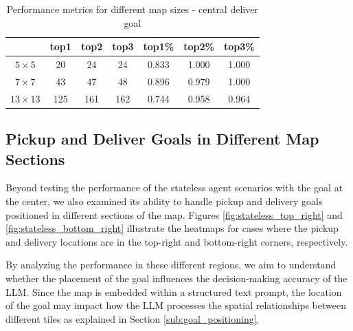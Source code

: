 \vspace{5mm}
\begin{table}[h!]
  \centering
  \begin{tabular}{c|ccc|ccc}
                   & top1 & top2 & top3 & top1\% & top2\% & top3\% \\
    \hline
    $5 \times 5$   & 20   & 24   & 24   & 0.833  & 1.000  & 1.000  \\
    $7 \times 7$   & 43   & 47   & 48   & 0.896  & 0.979  & 1.000  \\
    $13 \times 13$ & 125  & 161  & 162  & 0.744  & 0.958  & 0.964  \\
  \end{tabular}
  \caption{Performance metrics for different map sizes - central deliver goal}
  \label{tab:performance}
\end{table}
\vspace{5mm}

\subsection{Pickup and Deliver Goals in Different Map Sections}

Beyond testing the performance of the stateless agent scenarios with the goal at
the center, we also examined its ability to handle pickup and delivery goals positioned
in different sections of the map. Figures \ref{fig:stateless_top_right} and
\ref{fig:stateless_bottom_right} illustrate the heatmaps for cases where the
pickup and delivery locations are in the top-right and bottom-right corners, respectively.

By analyzing the performance in these different regions, we aim to understand
whether the placement of the goal influences the decision-making accuracy of the
LLM. Since the map is embedded within a structured text prompt, the location of
the goal may impact how the LLM processes the spatial relationships between
different tiles as explained in Section \ref{sub:goal_positioning}.

